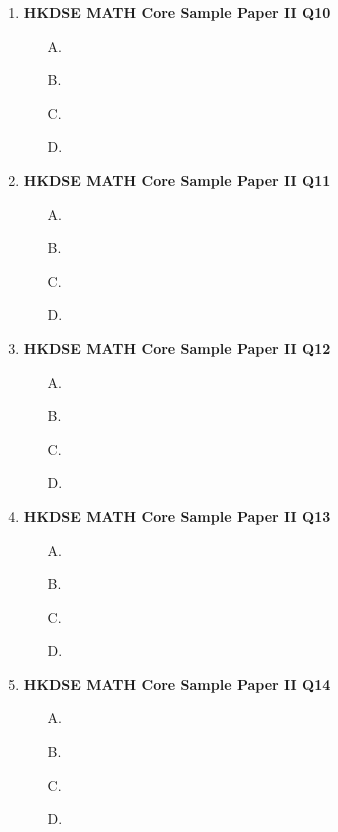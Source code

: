 \documentclass[12pt]{article}
\begin{document}
\begin{enumerate}
			
			\begin{enumerate}
				\item[A.]
				\item[B.]
		\item[C.]
		\item[D.]
	\end{enumerate}
	\item \textbf{HKDSE MATH Core Sample Paper II Q10}\\
	\begin{enumerate}
		\item[A.]
		\item[B.]
		\item[C.]
		\item[D.]
	\end{enumerate}
	\item \textbf{HKDSE MATH Core Sample Paper II Q11}\\
	\begin{enumerate}
		\item[A.]
		\item[B.]
		\item[C.]
		\item[D.]
	\end{enumerate}
	\item \textbf{HKDSE MATH Core Sample Paper II Q12}\\
	\begin{enumerate}
		\item[A.]
		\item[B.]
		\item[C.]
		\item[D.]
	\end{enumerate}
	\item \textbf{HKDSE MATH Core Sample Paper II Q13}\\
	\begin{enumerate}
		\item[A.]
		\item[B.]
		\item[C.]
		\item[D.]
	\end{enumerate}
	\item \textbf{HKDSE MATH Core Sample Paper II Q14}\\
	\begin{enumerate}
		\item[A.]
		\item[B.]
		\item[C.]
		\item[D.]
	\end{enumerate}

\end{enumerate}
\end{document}
